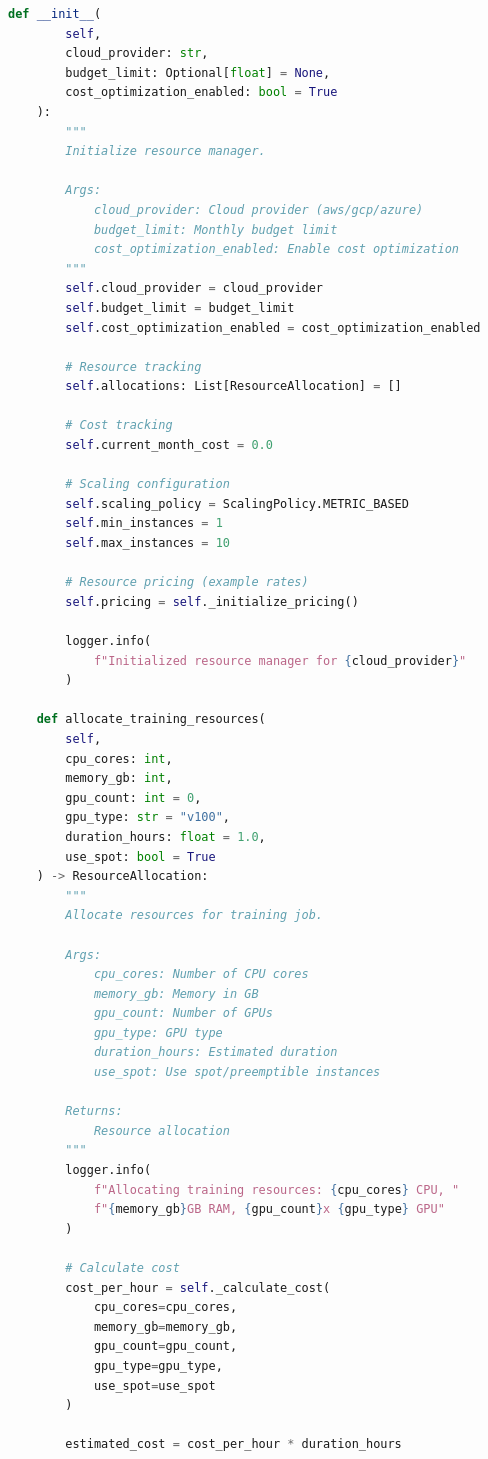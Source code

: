 \begin{lstlisting}[language=Python, caption={Resource Management with Cost Optimization}]
    def __init__(
        self,
        cloud_provider: str,
        budget_limit: Optional[float] = None,
        cost_optimization_enabled: bool = True
    ):
        """
        Initialize resource manager.

        Args:
            cloud_provider: Cloud provider (aws/gcp/azure)
            budget_limit: Monthly budget limit
            cost_optimization_enabled: Enable cost optimization
        """
        self.cloud_provider = cloud_provider
        self.budget_limit = budget_limit
        self.cost_optimization_enabled = cost_optimization_enabled

        # Resource tracking
        self.allocations: List[ResourceAllocation] = []

        # Cost tracking
        self.current_month_cost = 0.0

        # Scaling configuration
        self.scaling_policy = ScalingPolicy.METRIC_BASED
        self.min_instances = 1
        self.max_instances = 10

        # Resource pricing (example rates)
        self.pricing = self._initialize_pricing()

        logger.info(
            f"Initialized resource manager for {cloud_provider}"
        )

    def allocate_training_resources(
        self,
        cpu_cores: int,
        memory_gb: int,
        gpu_count: int = 0,
        gpu_type: str = "v100",
        duration_hours: float = 1.0,
        use_spot: bool = True
    ) -> ResourceAllocation:
        """
        Allocate resources for training job.

        Args:
            cpu_cores: Number of CPU cores
            memory_gb: Memory in GB
            gpu_count: Number of GPUs
            gpu_type: GPU type
            duration_hours: Estimated duration
            use_spot: Use spot/preemptible instances

        Returns:
            Resource allocation
        """
        logger.info(
            f"Allocating training resources: {cpu_cores} CPU, "
            f"{memory_gb}GB RAM, {gpu_count}x {gpu_type} GPU"
        )

        # Calculate cost
        cost_per_hour = self._calculate_cost(
            cpu_cores=cpu_cores,
            memory_gb=memory_gb,
            gpu_count=gpu_count,
            gpu_type=gpu_type,
            use_spot=use_spot
        )

        estimated_cost = cost_per_hour * duration_hours


\end{lstlisting}
